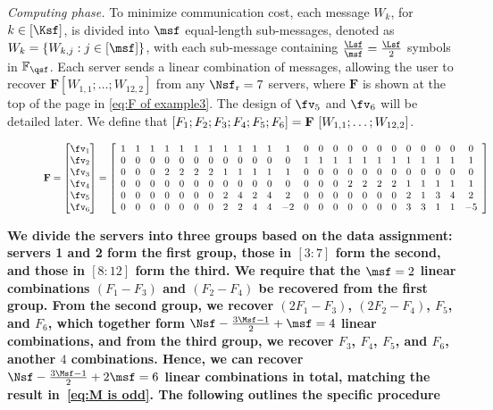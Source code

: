 \documentclass[conference,letterpaper]{IEEEtran}
\begin{document}
\begin{example}
{\it Computing phase.}
To minimize communication cost, each message $W_k$, for $k \in [\Ksf]$, is divided into $\msf$ equal-length sub-messages, denoted as $W_k = \{W_{k,j} : j \in [\msf]\}$, with each sub-message containing $\frac{\Lsf}{\msf} = \frac{\Lsf}{2}$ symbols in $\mathbb{F}_{\qsf}$. Each server sends a linear combination of messages, allowing the user to recover
\(\mathbf{F} [W_{1,1}; \ldots; W_{12,2}]\) from any \(\Nsf_{\rm r} = 7\) servers, where
\(\mathbf{F}\) is shown at the top of the page in \eqref{eq:F of example3}. The design of \(\fv_5\) and \(\fv_6\) will be detailed later.
We define that $[F_1;F_2;F_3;F_4;F_5;F_6]=  {\bf F} \  [W_{1,1};\ldots;W_{12,2}] $.
\begin{figure*}
\begin{equation}
\scalebox{0.8}{%
\(
{\bf F} = \begin{bmatrix}  
 {\fv}_1 \\
 {\fv}_2 \\
 {\fv}_3 \\
 {\fv}_4\\
 {\fv}_5 \\
 {\fv}_6
\end{bmatrix}
=
\left[
\begin{array}{cccccccccccccccccccccccc}
  1 & 1 & 1 & 1 & 1 & 1 & 1 & 1 & 1 & 1 & 1 & 1 & 0 & 0 & 0 & 0 & 0 & 0 & 0 & 0 & 0 & 0 & 0 & 0 \\
  0 & 0 & 0 & 0 & 0 & 0 & 0 & 0 & 0 & 0 & 0 & 0 & 1 & 1 & 1 & 1 & 1 & 1 & 1 & 1 & 1 & 1 & 1 & 1 \\
  0 & 0 & 0 & 2 & 2 & 2 & 2 & 1 & 1 & 1 & 1 & 1 & 0 & 0 & 0 & 0 & 0 & 0 & 0 & 0 & 0 & 0 & 0 & 0 \\
  0 & 0 & 0 & 0 & 0 & 0 & 0 & 0 & 0 & 0 & 0 & 0 & 0 & 0 & 0 & 2 & 2 & 2 & 2 & 1 & 1 & 1 & 1 & 1 \\
  0 & 0 & 0 & 0 & 0 & 0 & 0 & 2 & 4 & 2 & 4 & 2 & 0 & 0 & 0 & 0 & 0 & 0 & 0 & 2 & 1 & 3 & 4 & 2 \\
  0 & 0 & 0 & 0 & 0 & 0 & 0 & 2 & 2 & 4 & 4 & -2 & 0 & 0 & 0 & 0 & 0 & 0 & 0 & 3 & 3 & 1 & 1 & -5 \\
\end{array}
\right]
\)
}
\label{eq:F of example3}
\end{equation}
\end{figure*}


\textbf{We divide the servers into three groups based on the data assignment: servers 1 and 2 form the first group, those in $[3:7]$ form the second, and those in $[8:12]$ form the third. We require that the $\msf=2$ linear combinations \((F_1 - F_3)\) and \((F_2 - F_4)\) be recovered from the first group. From the second group, we recover \((2F_1 - F_3)\), \((2F_2 - F_4)\), \(F_5\), and \(F_6\), which together form \(\Nsf - \frac{3\Msf - 1}{2} + \msf = 4\) linear combinations, and from the third group, we recover \(F_3\), \(F_4\), \(F_5\), and \(F_6\), another \(4\) combinations. Hence, we can recover 
$\Nsf - \frac{3\Msf - 1}{2} + 2\msf = 6$ linear combinations in total, matching the result in~\eqref{eq:M is odd}. The following outlines the specific procedure}




\end{example}
\end{document}
